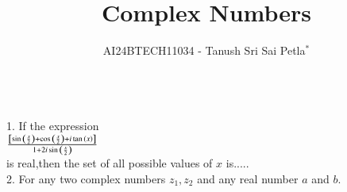 \documentclass[journal,12pt,twocolumn]{IEEEtran}
\theoremstyle{remark}
\begin{document}

\vspace{3cm}

\title{Complex Numbers}
\author{AI24BTECH11034 - Tanush Sri Sai Petla$^{*}$%
}

\\
1. If the expression    \\       
$\frac{{}\left[\sin{\ensuremath{\left({\frac{x}{2}}\right)}}+\cos{\ensuremath{\left({\frac{x}{2}}\right)}}+i\tan{\ensuremath{\left(x\right)}}\right]}{1+2i\sin{\ensuremath{\left(\frac{x}{2}\right)}}}$\hfill{}\\
is real,then the set of all possible values of $x$ is..... \\
2.  For any two complex numbers $z_1,z_2$ and any real number $a$ and $b$.
\end{document}
